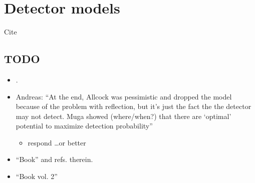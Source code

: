 \section{Detector models}

Cite \cite{
  Allcock-1, Allcock-2, Allcock-3,
  Muga_ArrTimeOpNormal, Damborenea,
  Sudarshan_Zeno,
  Echanobe,
  Savvidou-1, Savvidou-2,
  ComplexAbsPot,
}

\subsection{TODO}

\begin{itemize}
  \item \cite[sec. 2-4]{Allcock-2}.

  \item Andreas: ``At the end, Allcock was pessimistic and dropped the model because of the problem with reflection,
but it's just the fact the the detector may not detect. Muga showed (where/when?)
that there are `optimal' potential to maximize detection probability''
  \begin{itemize}
    \item \cite[3, 6]{Leavens_TOA} respond \dots or better \cite{Leavens_backflow}
  \end{itemize}

  \item ``Book'' \cite[Sec. 1.4.3]{TQM1} and refs. therein.

  \item ``Book vol. 2'' \cite[Ch. 4]{TQM2}
\end{itemize}

